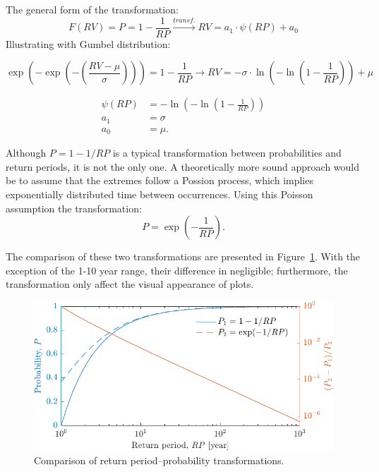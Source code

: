 The general form of the transformation:
\begin{equation*}
	F\left( {RV} \right) = P = 1 - \frac{1}{{RP}}\xrightarrow{transf.}RV = {a_1} \cdot \psi \left( {RP} \right) + {a_0}
\end{equation*}
Illustrating with Gumbel distribution:

\begin{equation*}
	\exp \left( { - \exp \left( { - \left( {\frac{{RV - \mu }}{\sigma }} \right)} \right)} \right) = 1 - \frac{1}{{RP}} \to RV =  - \sigma  \cdot {\ln}\left( { - {{\ln }}\left( {1 - \frac{1}{{RP}}} \right)} \right) + \mu
\end{equation*}

\begin{equation*}
\begin{split}
	\psi \left( {RP} \right) & =  - {\ln}\left( { - {{\ln }}\left( {1 - \frac{1}{{RP}}} \right)} \right) \\
	a_1 & = \sigma \\
	a_0 & = \mu.
\end{split}
\end{equation*}

Although $P=1-1/RP$ is a typical transformation between probabilities and return periods, it is not the only one. A theoretically more sound approach would be to assume that the extremes follow a Possion process, which implies exponentially distributed time between occurrences. Using this Poisson assumption the transformation:
\begin{equation*}
	P = \exp \left( { - \frac{1}{{RP}}} \right).
\end{equation*}

The comparison of these two transformations are presented in Figure~\ref{fig:RP_P_transform}. With the exception of the 1-10 year range, their difference in negligible; furthermore, the transformation only affect the visual appearance of plots.

\begin{figure}[htbp!] 
	\centering    
	\includegraphics[]{RP_P_transform.pdf}
	\caption{Comparison of return period--probability transformations.}
	\label{fig:RP_P_transform}
\end{figure}
